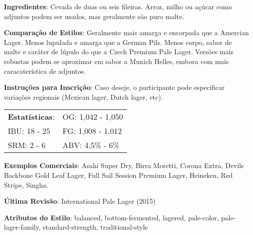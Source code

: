 \textbf{Ingredientes}: Cevada de duas ou seis fileiras. Arroz, milho ou açúcar como adjuntos podem ser usados, mas geralmente são puro malte.

\textbf{Comparação de Estilos}: Geralmente mais amarga e encorpada que a Amercian Lager. Menos lupulada e amarga que a German Pils. Menos corpo, sabor de malte e caráter de lúpulo do que a Czech Premium Pale Lager. Versões mais robustas podem se aproximar em sabor a Munich Helles, embora com mais caracaterística de adjuntos.

\textbf{Instruções para Inscrição}: Caso deseje, o participante pode especificar variações regionais (Mexican lager, Dutch lager, etc).

\begin{tabular}{@{}p{35mm}p{35mm}@{}}
  \textbf{Estatísticas}: & OG: 1,042 - 1,050 \\
  IBU: 18 - 25  & FG: 1,008 - 1,012  \\
  SRM: 2 - 6   & ABV: 4,5\% - 6\%
\end{tabular}

\textbf{Exemplos Comerciais}: Asahi Super Dry, Birra Moretti, Corona Extra, Devils Backbone Gold Leaf Lager, Full Sail Session Premium Lager, Heineken, Red Stripe, Singha.

\textbf{Última Revisão}: International Pale Lager (2015)

\textbf{Atributos do Estilo}: balanced, bottom-fermented, lagered, pale-color, pale-lager-family, standard-strength, traditional-style

